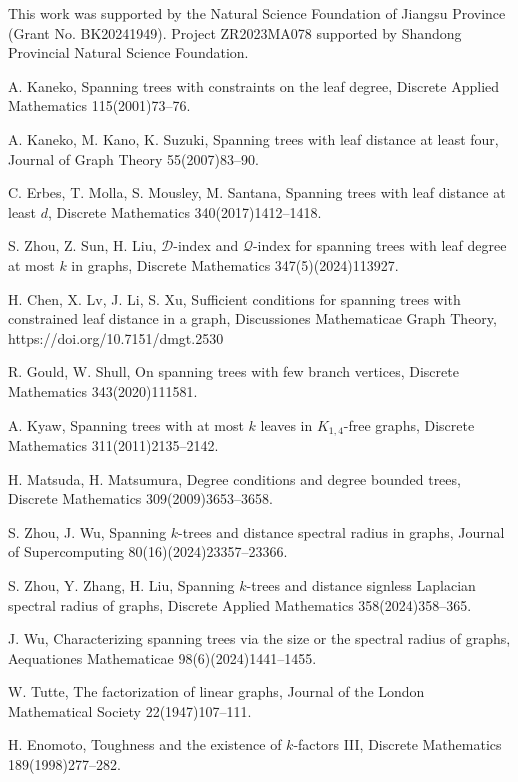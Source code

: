 \documentclass[10pt]{article}
\numberwithin{equation}{section}
\begin{document}
This work was supported by the Natural Science Foundation of Jiangsu Province (Grant No. BK20241949). Project ZR2023MA078 supported by Shandong
Provincial Natural Science Foundation.

\begin{thebibliography}{9999}

 A. Kaneko, Spanning trees with constraints on the leaf degree, Discrete Applied Mathematics 115(2001)73--76.

 A. Kaneko, M. Kano, K. Suzuki, Spanning trees with leaf distance at least four, Journal of Graph Theory 55(2007)83--90.

 C. Erbes, T. Molla, S. Mousley, M. Santana, Spanning trees with leaf distance at least $d$, Discrete Mathematics 340(2017)1412--1418.

 S. Zhou, Z. Sun, H. Liu, $\mathcal{D}$-index and $\mathcal{Q}$-index for spanning trees with leaf degree at most $k$ in graphs, Discrete
Mathematics 347(5)(2024)113927.

 H. Chen, X. Lv, J. Li, S. Xu, Sufficient conditions for spanning trees with constrained leaf distance in a graph, Discussiones
Mathematicae Graph Theory, https://doi.org/10.7151/dmgt.2530

 R. Gould, W. Shull, On spanning trees with few branch vertices, Discrete Mathematics 343(2020)111581.

 A. Kyaw, Spanning trees with at most $k$ leaves in $K_{1,4}$-free graphs, Discrete Mathematics 311(2011)2135--2142.

 H. Matsuda, H. Matsumura, Degree conditions and degree bounded trees, Discrete Mathematics 309(2009)3653--3658.

 S. Zhou, J. Wu, Spanning $k$-trees and distance spectral radius in graphs, Journal of Supercomputing 80(16)(2024)23357--23366.

 S. Zhou, Y. Zhang, H. Liu, Spanning $k$-trees and distance signless Laplacian spectral radius of graphs, Discrete Applied Mathematics 358(2024)358--365.

 J. Wu, Characterizing spanning trees via the size or the spectral radius of graphs, Aequationes Mathematicae 98(6)(2024)1441--1455.

 W. Tutte, The factorization of linear graphs, Journal of the London Mathematical Society 22(1947)107--111.

 H. Enomoto, Toughness and the existence of $k$-factors III, Discrete Mathematics 189(1998)277--282.


\end{thebibliography}
\end{document}
